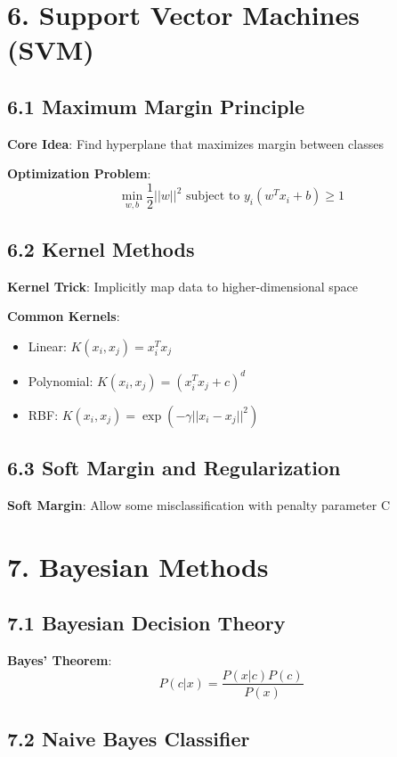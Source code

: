 \documentclass{amsart}
\theoremstyle{plain}
\theoremstyle{definition}
\theoremstyle{remark}
\begin{document}
\section{6. Support Vector Machines (SVM)}

\subsection{6.1 Maximum Margin Principle}

\textbf{Core Idea}: Find hyperplane that maximizes margin between classes

\textbf{Optimization Problem}:
\[
\min_{w,b} \frac{1}{2}||w||^2 \text{ subject to } y_i(w^Tx_i + b) \geq 1
\]

\subsection{6.2 Kernel Methods}

\textbf{Kernel Trick}: Implicitly map data to higher-dimensional space

\textbf{Common Kernels}:

\begin{itemize}
	\item Linear: $K(x_i, x_j) = x_i^T x_j$
	\item Polynomial: $K(x_i, x_j) = (x_i^T x_j + c)^d$
	\item RBF: $K(x_i, x_j) = \exp(-\gamma ||x_i - x_j||^2)$
\end{itemize}

\subsection{6.3 Soft Margin and Regularization}

\textbf{Soft Margin}: Allow some misclassification with penalty parameter C

\section{7. Bayesian Methods}

\subsection{7.1 Bayesian Decision Theory}

\textbf{Bayes' Theorem}:
\[
P(c|x) = \frac{P(x|c)P(c)}{P(x)}
\]

\subsection{7.2 Naive Bayes Classifier}
\end{document}
